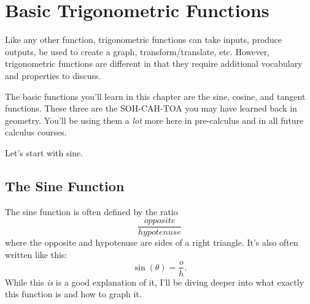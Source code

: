 \clearpage\chapter{Basic Trigonometric Functions}
Like any other function, trigonometric functions can take inputs, produce outputs, be used to create a graph, transform/translate, etc. However, trigonometric functions are different in that they require additional vocabulary and properties to discuss.

The basic functions you'll learn in this chapter are the sine, cosine, and tangent functions. These three are the SOH-CAH-TOA you may have learned back in geometry. You'll be using them a \textit{lot} more here in pre-calculus and in all future calculus courses.

Let's start with sine.
\clearpage
\section{The Sine Function}
The sine function is often defined by the ratio
\[
\frac{opposite}{hypotenuse}
\]
where the opposite and hypotenuse are sides of a right triangle. It's also often written like this:
\[
\sin(\theta) = \frac{o}{h} \text{.}
\]
While this \textit{is} is a good explanation of it, I'll be diving deeper into what exactly this function is and how to graph it.
